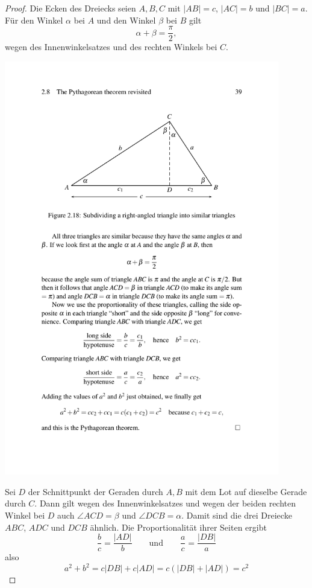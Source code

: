 \begin{proof}
    Die Ecken des Dreiecks seien $A,B,C$ mit $|AB|=c$, $|AC|=b$ und $|BC|=a$. Für den Winkel
    $\alpha$ bei $A$ und den Winkel $\beta$ bei $B$ gilt
    $$
        \alpha + \beta = \frac{\pi}{2},
    $$
    wegen des Innenwinkelsatzes und des rechten Winkels bei $C$.

    \begin{center}
        \includegraphics[width=12cm]{BILDER/BildBeweisPythagoras.pdf}
    \end{center}

    Sei $D$ der Schnittpunkt der Geraden durch $A,B$ mit dem Lot auf dieselbe Gerade durch $C$. Dann
    gilt wegen des Innenwinkelsatzes und wegen der beiden rechten Winkel bei $D$ auch $\angle ACD =
    \beta$ und $\angle DCB = \alpha$. Damit sind die drei Dreiecke $ABC$, $ADC$ und $DCB$ ähnlich.
    Die Proportionalität ihrer Seiten ergibt
    $$
        \frac{b}{c} = \frac{|AD|}{b} \qquad \mbox{und} \qquad \frac{a}{c} = \frac{|DB|}{a}
    $$
    also
    $$
        a^2+b^2 = c |DB| + c |AD| = c (|DB| + |AD|) = c^2
    $$
\end{proof}

